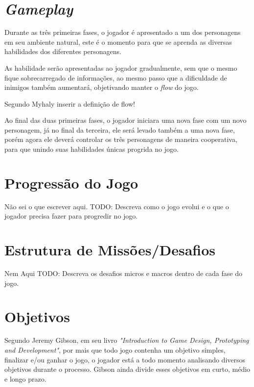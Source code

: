 \section{\textit{Gameplay}}

Durante as três primeiras fases, o jogador é apresentado a um dos personagens em seu ambiente natural, este é o momento para que se aprenda as diversas habilidades dos diferentes personagens.

As habilidade serão apresentadas ao jogador gradualmente, sem que o mesmo fique sobrecarregado de informações, ao mesmo passo que a dificuldade de inimigos também aumentará, objetivando manter o \textit{flow} do jogo.
\begin{citacao}
Segundo Myhaly inserir a definição de flow! \cite[74]{mihalyi2009}
\end{citacao}

Ao final das duas primeiras fases, o jogador iniciara uma nova fase com um novo personagem, já no  final da terceira, ele será levado também a uma nova fase, porém agora ele deverá controlar os três personagens de maneira cooperativa, para que unindo suas habilidades únicas progrida no jogo.


\section{Progressão do Jogo}

Não sei o que escrever aqui.
TODO: Descreva como o jogo evolui e o que o jogador precisa fazer para progredir no jogo.

\section{Estrutura de Missões/Desafios}

Nem Aqui
TODO: Descreva os desafios micros e macros dentro de cada fase do jogo.

\section{Objetivos}

Segundo Jeremy Gibson, em seu livro \textit{"Introduction to Game Design, Prototyping and Development"}, por mais que todo jogo contenha um objetivo simples, finalizar e/ou ganhar o jogo, o jogador está a todo momento analisando diversos objetivos durante o processo. Gibson ainda divide esses objetivos em curto, médio e longo prazo. \cite{gibson2014}

